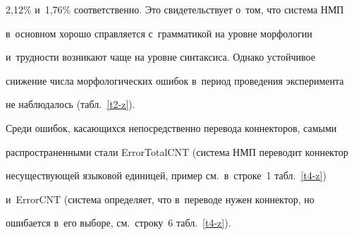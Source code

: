 2,12\% и~1,76\% соответственно. Это свидетельствует о~том, что система НМП 


в~основном хорошо справляется с~грамматикой на уровне морфологии 


и~трудности возникают чаще на уровне синтаксиса. Однако устойчивое 


снижение числа морфологических ошибок в~период проведения эксперимента 


не наблюдалось (табл.~\ref{t2-z}).


  


  Среди ошибок, касающихся непосредственно перевода коннекторов, самыми 


распространенными стали ErrorTotalCNT (система НМП переводит коннектор 


несуществующей языковой единицей, пример см.\ в~строке~1 табл.~\ref{t4-z}) 


и~ErrorCNT (система определяет, что в~переводе нужен коннектор, но 


ошибается в~его выборе, см.\ строку~6 табл.~\ref{t4-z}).


  


